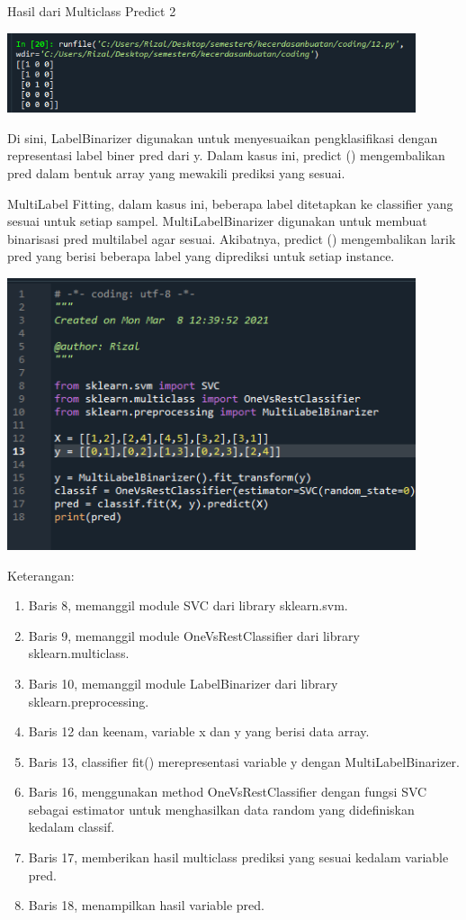 \documentclass{article}
\begin{document}
Hasil dari Multiclass Predict 2
    
    \begin{center}
    \includegraphics[width=12cm]{figures/1184033/chapter1/28.PNG}
    \end{center}

Di sini, LabelBinarizer digunakan untuk menyesuaikan pengklasifikasi dengan representasi label biner pred dari y. Dalam kasus ini, predict () mengembalikan pred dalam bentuk array yang mewakili prediksi yang sesuai.

MultiLabel Fitting, dalam kasus ini, beberapa label ditetapkan ke classifier yang sesuai untuk setiap sampel. MultiLabelBinarizer digunakan untuk membuat binarisasi pred multilabel agar sesuai. Akibatnya, predict () mengembalikan larik pred yang berisi beberapa label yang diprediksi untuk setiap instance.
    
    \begin{center}
    \includegraphics[width=12cm]{figures/1184033/chapter1/29.PNG}
    \end{center}
   
Keterangan:
    \begin{enumerate}
\item Baris 8, memanggil module SVC dari library sklearn.svm.
\item Baris 9, memanggil module OneVsRestClassifier dari library sklearn.multiclass.
\item Baris 10, memanggil module LabelBinarizer dari library sklearn.preprocessing.
\item Baris 12 dan keenam, variable x dan y yang berisi data array.
\item Baris 13, classifier fit() merepresentasi variable y dengan MultiLabelBinarizer.
\item Baris 16, menggunakan method OneVsRestClassifier dengan fungsi SVC sebagai estimator untuk menghasilkan data random yang didefiniskan kedalam classif.
\item Baris 17, memberikan hasil multiclass prediksi yang sesuai kedalam variable pred.
\item Baris 18, menampilkan hasil variable pred. 
    \end{enumerate}
\end{document}
